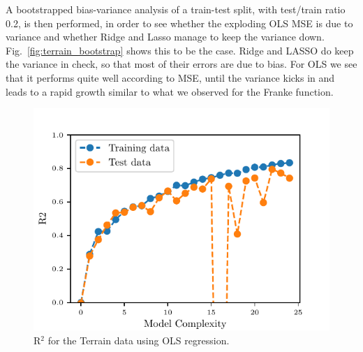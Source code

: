 \documentclass[reprint, english, nofootinbib]{revtex4-2}
\begin{document}
A bootstrapped bias-variance analysis of a train-test split, with test/train ratio 0.2, is then performed, in order to see whether the exploding OLS MSE is due to variance and whether Ridge and Lasso manage to keep the variance down. Fig.~\ref{fig:terrain_bootstrap} shows this to be the case. Ridge and LASSO do keep the variance in check, so that most of their errors are due to bias. For OLS we see that it performs quite well according to MSE, until the variance kicks in and leads to a rapid growth similar to what we observed for the Franke function.






\begin{figure}
   \center
   \includegraphics[width=\columnwidth]{R2_terrain_data.pdf}
   \caption{R$^2$ for the Terrain data using OLS regression.}
\end{figure}
\end{document}
